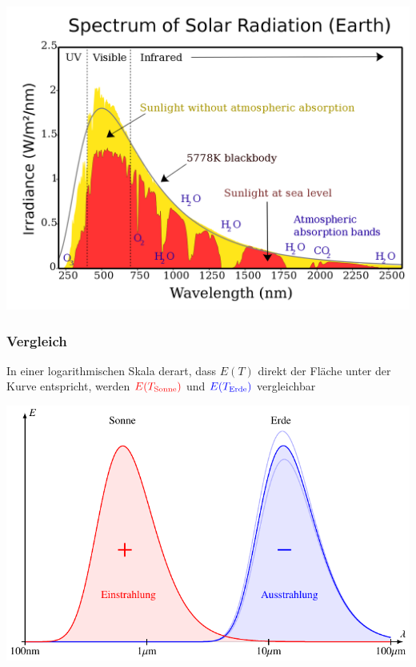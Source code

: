 \begin{frame}
\begin{center}
\includegraphics[width=0.85\hsize]{../../skript/chapters/1/Solar_spectrum_en.png}
\end{center}
\end{frame}

\begin{frame}
\frametitle{Vergleich}
In einer logarithmischen Skala derart, dass $E(T)$ direkt der Fläche unter
der Kurve entspricht, werden $\color{red}E(T_{\text{Sonne}})$ und
$\color{blue}E(T_{\text{Erde}})$
vergleichbar
\begin{center}
\includegraphics[width=0.7\hsize]{../../skript/chapters/1/vergleich.pdf}
\end{center}
\end{frame}



